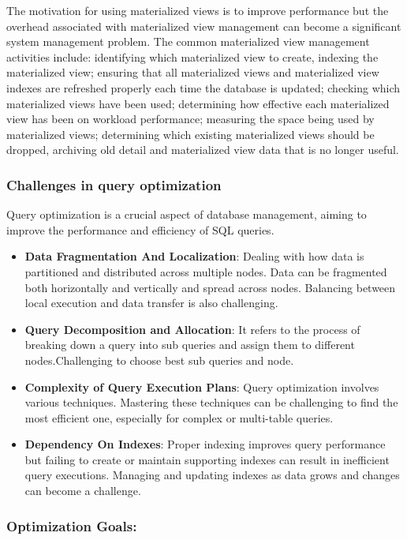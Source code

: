 The motivation for using materialized views is to improve performance but the overhead associated with materialized view management can become a significant system management problem. The common materialized view management activities include: identifying which materialized view to create, indexing the materialized view; ensuring that all materialized views and materialized view indexes are refreshed properly each time the database is updated; checking which materialized views have been used; determining how effective each materialized view has been on workload performance; measuring the space being used by materialized views; determining which existing materialized views should be dropped,  archiving old detail and materialized view data that is no longer useful.\cite{Ashadevi2008CostEA,1363763}

\subsubsection{Challenges in query optimization} Query optimization is a crucial aspect of database management, aiming to improve the performance and efficiency of SQL queries.
\begin{itemize}
    \item\textbf{Data Fragmentation And Localization}: Dealing with how data is partitioned and distributed across multiple nodes. Data can be fragmented both horizontally and vertically and spread across nodes. Balancing between local execution and data transfer is also challenging. 
    \item\textbf{Query Decomposition and Allocation}: It refers to the process of breaking down a query into sub queries and assign them to different nodes.Challenging to choose best sub queries and node.
    \item\textbf{Complexity of Query Execution Plans}: Query optimization involves various techniques. Mastering these techniques can be challenging to find the most efficient one, especially for complex or multi-table queries.
    \item\textbf{Dependency On Indexes}: Proper indexing improves query performance but failing to create or maintain supporting indexes can result in inefficient query executions. Managing and updating indexes as data grows and changes can become a challenge.\\
    \cite{team-2020,etutorials-03-2024,editor-ijmter-2015}
\end{itemize}
\subsubsection*{Optimization Goals:}

